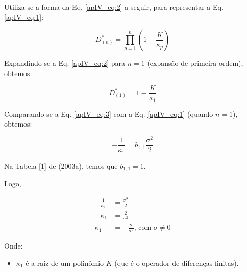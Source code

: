 Utiliza-se a forma da Eq. \ref{apIV_eq:2} a seguir, para representar a Eq. \ref{apIV_eq:1}:

\begin{equation}
\label{apIV_eq:2}
D^{*}_{(n)} = \prod_{p=1}^{n}{\left(1 - \frac{K}{\kappa_{p}}\right)}
\end{equation}

Expandindo-se a Eq. \ref{apIV_eq:2} para $n=1$ (expansão de primeira ordem), obtemos:

\begin{equation}
\label{apIV_eq:3}
D^{*}_{(1)} = 1 - \frac{K}{\kappa_{1}}
\end{equation}

Comparando-se a Eq. \ref{apIV_eq:3} com a Eq. \ref{apIV_eq:1} (quando $n=1$), obtemos:

\begin{equation}
\label{apIV_eq:4}
- \frac{1}{\kappa_{1}} = b_{1,1} \frac{\sigma^{2}}{2}
\end{equation}

Na Tabela [1] de  (2003a), temos que $b_{1,1} = 1$.

Logo,





\begin{align}
\label{apIV_eq:5}
- \frac{1}{\kappa_{1}} &= \frac{\sigma^{2}}{2} \\
- \kappa_{1} &= \frac{2}{\sigma^{2}} \\
\kappa_{1} &= - \frac{2}{\sigma^{2}} \text{, com $\sigma \neq 0$}
\end{align}

Onde:

\begin{itemize}
	\item $\kappa_{1}$ é a raiz de um polinômio $K$ (que é o operador de diferenças finitas).
\end{itemize}

